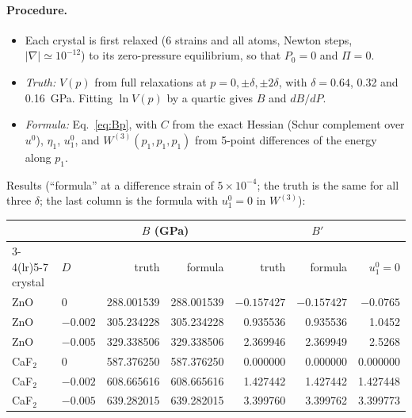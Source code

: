 \documentclass[11pt,a4paper]{article}
\newcommand{\Wt}{W^{(3)}}\newcommand{\Wf}{W^{(4)}}
\begin{document}
\paragraph{Procedure.}
\begin{itemize}
\item Each crystal is first relaxed (6 strains and all atoms, Newton steps, $|\nabla|\simeq10^{-12}$) to its
  zero-pressure equilibrium, so that $P_0=0$ and $\Pi=0$.
\item \emph{Truth:} $V(p)$ from full relaxations at $p=0,\pm\delta,\pm2\delta$, with $\delta=0.64$, 0.32 and 0.16~GPa.
  Fitting $\ln V(p)$ by a quartic gives $B$ and $dB/dP$.
\item \emph{Formula:} Eq.~\eqref{eq:Bp}, with $C$ from the exact Hessian (Schur complement over $u^0$),
  $\eta_1$, $u^0_1$, and $\Wt(p_1,p_1,p_1)$ from 5-point differences of the energy along $p_1$.
\end{itemize}
Results (``formula'' at a difference strain of $5\times10^{-4}$; the truth is the same for all three $\delta$; the last
column is the formula with $u^0_1=0$ in $\Wt$):
\begin{center}
\begin{tabular}{llrrrrr}
\toprule
& & \multicolumn{2}{c}{$B$ (GPa)} & \multicolumn{3}{c}{$B'$}\\
\cmidrule(lr){3-4}\cmidrule(lr){5-7}
crystal & $D$ & truth & formula & truth & formula & $u^0_1=0$\\
\midrule
ZnO  & 0      & 288.001539 & 288.001539 & $-0.157427$ & $-0.157427$ & $-0.0765$\\
ZnO  & $-0.002$ & 305.234228 & 305.234228 & 0.935536 & 0.935536 & 1.0452\\
ZnO  & $-0.005$ & 329.338506 & 329.338506 & 2.369946 & 2.369949 & 2.5268\\
CaF$_2$ & 0      & 587.376250 & 587.376250 & 0.000000 & 0.000000 & 0.000000\\
CaF$_2$ & $-0.002$ & 608.665616 & 608.665616 & 1.427442 & 1.427442 & 1.427448\\
CaF$_2$ & $-0.005$ & 639.282015 & 639.282015 & 3.399760 & 3.399762 & 3.399773\\
\bottomrule
\end{tabular}
\end{center}
\end{document}
